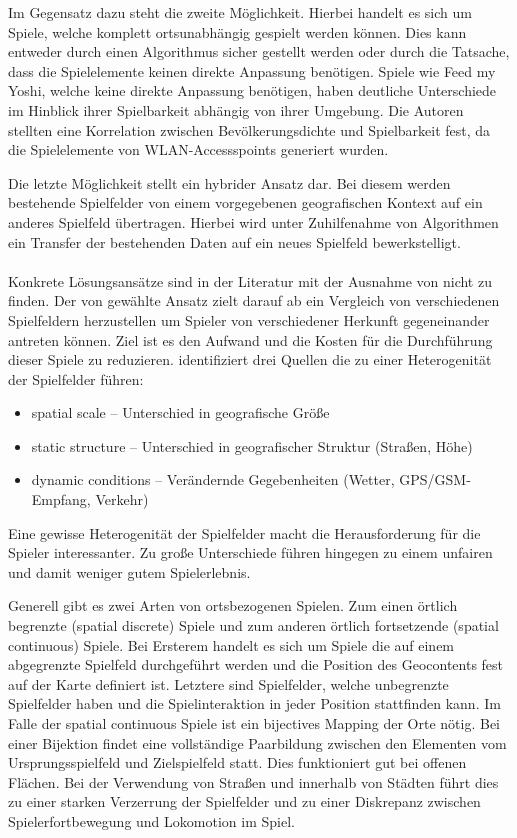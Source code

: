 Im Gegensatz dazu steht die zweite Möglichkeit. Hierbei handelt es sich um Spiele, welche komplett ortsunabhängig gespielt werden können.
Dies kann entweder durch einen Algorithmus sicher gestellt werden oder durch die Tatsache, dass die Spielelemente keinen direkte Anpassung benötigen.
Spiele wie Feed my Yoshi, welche keine direkte Anpassung benötigen, haben deutliche Unterschiede im Hinblick ihrer Spielbarkeit abhängig von ihrer Umgebung. Die Autoren stellten  eine Korrelation zwischen Bevölkerungsdichte und Spielbarkeit fest, da die Spielelemente von WLAN-Accessspoints generiert wurden.\cite{Bell.2006}

Die letzte Möglichkeit stellt ein hybrider Ansatz dar. Bei diesem werden bestehende Spielfelder von einem vorgegebenen geografischen Kontext auf ein anderes Spielfeld übertragen. Hierbei wird unter Zuhilfenahme von Algorithmen ein Transfer der bestehenden Daten auf ein neues Spielfeld bewerkstelligt.
\\\\
Konkrete Lösungsansätze sind in der Literatur mit der Ausnahme von \textcite{Kiefer.2007}
nicht zu finden.
Der von \textcite{Kiefer.2007} gewählte Ansatz zielt darauf ab ein Vergleich von verschiedenen Spielfeldern herzustellen um Spieler von verschiedener Herkunft gegeneinander antreten können. Ziel ist es den Aufwand und die Kosten für die Durchführung dieser Spiele zu reduzieren. \textcite{Kiefer.2007} identifiziert drei Quellen die zu einer Heterogenität der Spielfelder führen:

\begin{itemize}
\item spatial scale -- Unterschied in geografische Größe
\item static structure -- Unterschied in geografischer Struktur (Straßen, Höhe) 
\item dynamic conditions -- Verändernde Gegebenheiten (Wetter, GPS/GSM-Empfang, Verkehr)
\end{itemize}

Eine gewisse Heterogenität der Spielfelder macht die Herausforderung für die Spieler interessanter. Zu große Unterschiede führen hingegen zu einem unfairen und damit weniger gutem Spielerlebnis.

Generell gibt es zwei Arten von ortsbezogenen Spielen. Zum einen örtlich begrenzte (spatial discrete) Spiele und zum anderen örtlich fortsetzende (spatial
continuous) Spiele.
Bei Ersterem handelt es sich um Spiele die auf einem abgegrenzte Spielfeld durchgeführt werden und die Position des Geocontents fest auf der Karte definiert ist. Letztere sind Spielfelder, welche unbegrenzte Spielfelder haben und die Spielinteraktion in jeder Position stattfinden kann.
Im Falle der spatial continuous Spiele ist ein bijectives Mapping der Orte nötig.
Bei einer Bijektion findet eine vollständige Paarbildung zwischen den Elementen vom Ursprungsspielfeld und Zielspielfeld statt.\cite{Athanasiadis.1999}
Dies funktioniert gut bei offenen Flächen. Bei der Verwendung von Straßen und innerhalb von Städten führt dies zu einer starken Verzerrung der Spielfelder und zu einer Diskrepanz zwischen Spielerfortbewegung und Lokomotion im Spiel.


